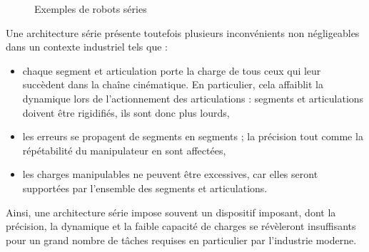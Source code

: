\begin{figure}[!ht]
  \centering
       \hfill
    \caption{\footnotesize{Exemples de robots séries}}
\label{intro:fig2}
\end{figure}

Une architecture série présente toutefois plusieurs inconvénients non négligeables dans un contexte industriel tels que :
\begin{itemize}
 \item chaque segment et articulation porte la charge de tous ceux qui leur succèdent dans la chaîne cinématique. En particulier, cela affaiblit la dynamique lors de l'actionnement des articulations : segments et articulations doivent être rigidifiés, ils sont donc plus lourds, 
 \item les erreurs se propagent de segments en segments ; la précision tout comme la répétabilité du manipulateur en sont affectées,
 \item les charges manipulables ne peuvent être excessives, car elles seront supportées par l'ensemble des segments et articulations.
\end{itemize}

Ainsi, une architecture série impose souvent un dispositif imposant, dont la précision, la dynamique et la faible capacité de charges se révèleront insuffisants pour un grand nombre de tâches requises en particulier par l'industrie moderne.

